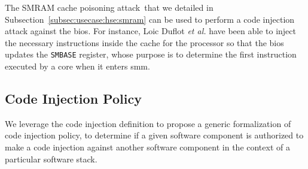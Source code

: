 \begin{example}
  The SMRAM cache poisoning attack\,\cite{duflot2009smram,wojtczuk2009smram}
  that we detailed in Subsection~\ref{subsec:usecase:hse:smram} can be used to
  perform a code injection attack against the \ac{bios}.
  For instance, Loic Duflot \emph{et al.} have been able to inject the necessary
  instructions inside the cache for the processor so that the \ac{bios} updates
  the \texttt{SMBASE} register, whose purpose is to determine the first
  instruction executed by a core when it enters \ac{smm}.
\end{example}

\subsection{Code Injection Policy}
\label{subsec:speccert:globalsec}

We leverage the code injection definition to propose a generic formalization of
code injection policy, to determine if a given software component is authorized
to make a code injection against another software component in the context of a
particular software stack.

